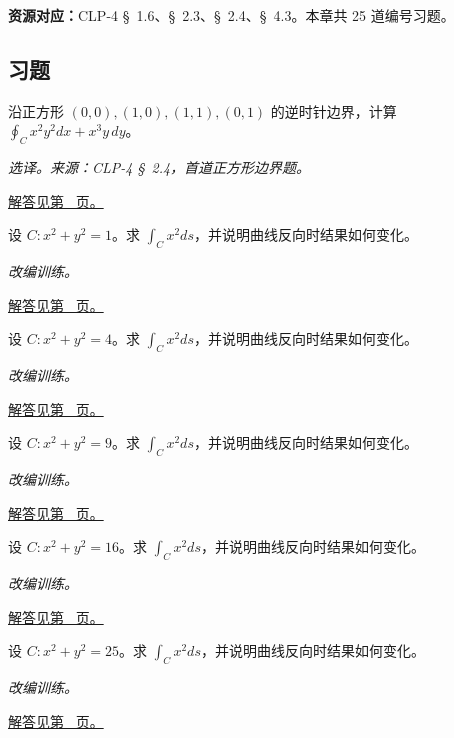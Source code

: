 \documentclass[12pt,fontset=fandol]{ctexart}
\begin{document}
\textbf{资源对应：}CLP-4 \S~1.6、\S~2.3、\S~2.4、\S~4.3。本章共 25 道编号习题。
\subsection{习题}
\begin{example}[正方形边界的直接积分]\label{ex:c41q1}
沿正方形 $(0,0),(1,0),(1,1),(0,1)$ 的逆时针边界，计算 $\oint_Cx^2y^2dx+x^3y\,dy$。
\par\textit{选译。来源：CLP-4 \S~2.4，首道正方形边界题。}\par\hyperref[ans:c41q1]{解答见第~\pageref{ans:c41q1} 页。}
\end{example}
\begin{example}[圆上的第一类曲线积分]\label{ex:c41q2}
设 $C:x^2+y^2=1$。求 $\displaystyle\int_Cx^2ds$，并说明曲线反向时结果如何变化。
\par\textit{改编训练。}\par\hyperref[ans:c41q2]{解答见第~\pageref{ans:c41q2} 页。}
\end{example}
\begin{example}[圆上的第一类曲线积分]\label{ex:c41q3}
设 $C:x^2+y^2=4$。求 $\displaystyle\int_Cx^2ds$，并说明曲线反向时结果如何变化。
\par\textit{改编训练。}\par\hyperref[ans:c41q3]{解答见第~\pageref{ans:c41q3} 页。}
\end{example}
\begin{example}[圆上的第一类曲线积分]\label{ex:c41q4}
设 $C:x^2+y^2=9$。求 $\displaystyle\int_Cx^2ds$，并说明曲线反向时结果如何变化。
\par\textit{改编训练。}\par\hyperref[ans:c41q4]{解答见第~\pageref{ans:c41q4} 页。}
\end{example}
\begin{example}[圆上的第一类曲线积分]\label{ex:c41q5}
设 $C:x^2+y^2=16$。求 $\displaystyle\int_Cx^2ds$，并说明曲线反向时结果如何变化。
\par\textit{改编训练。}\par\hyperref[ans:c41q5]{解答见第~\pageref{ans:c41q5} 页。}
\end{example}
\begin{example}[圆上的第一类曲线积分]\label{ex:c41q6}
设 $C:x^2+y^2=25$。求 $\displaystyle\int_Cx^2ds$，并说明曲线反向时结果如何变化。
\par\textit{改编训练。}\par\hyperref[ans:c41q6]{解答见第~\pageref{ans:c41q6} 页。}
\end{example}
\end{document}
